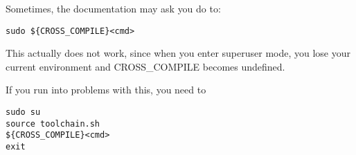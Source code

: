 Sometimes, the documentation may ask you do to:

\begin{verbatim}
sudo ${CROSS_COMPILE}<cmd>
\end{verbatim}

This actually does not work, since when you enter superuser mode, you
lose your current environment and CROSS\_COMPILE becomes undefined.

If you run into problems with this, you need to
\begin{verbatim}
sudo su
source toolchain.sh
${CROSS_COMPILE}<cmd>
exit
\end{verbatim}

